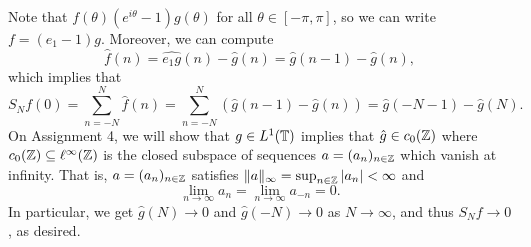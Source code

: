 \begin{pf}
    Note that $f(\theta) (e^{i\theta} - 1)g(\theta)$ for all $\theta \in 
    [-\pi, \pi]$, so we can write $f = (e_1 - 1)g$. Moreover, we can compute 
    \[ \hat f(n) = \widehat{e_1g}(n) - \hat g(n) = \hat g(n-1) - \hat g(n), \] 
    which implies that 
    \[ S_N f(0) = \sum_{n=-N}^N \hat f(n) = 
    \sum_{n=-N}^N (\hat g(n-1) - \hat g(n)) = \hat g(-N-1) - \hat g(N). \] 
    On Assignment 4, we will show that $g \in L^1(\mathbb{T})$ implies that 
    $\hat g \in c_0(\mathbb{Z})$ where $c_0(\mathbb{Z}) \subseteq \ell^\infty(\mathbb{Z})$ is the 
    closed subspace of sequences $a = (a_n)_{n\in\mathbb{Z}}$ which vanish at infinity.
    That is, $a = (a_n)_{n\in\mathbb{Z}}$ satisfies $\|a\|_\infty = \sup_{n\in\mathbb{Z}} 
    |a_n| < \infty$ and 
    \[ \lim_{n\to\infty} a_n = \lim_{n\to\infty} a_{-n} = 0. \]  
    In particular, we get $\hat g(N) \to 0$ and $\hat g(-N) \to 0$ 
    as $N \to \infty$, and thus $S_N f \to 0$, as desired. 
\end{pf}
